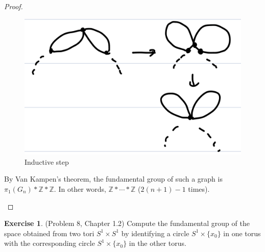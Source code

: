 \documentclass[12pt, psamsfonts]{amsart}
\theoremstyle{definition}
\newtheorem*{exer}{Exercise}
\theoremstyle{remark}
\numberwithin{equation}{section}
\begin{document}
\begin{proof}
\begin{itemize}
\begin{figure}
        \includegraphics[width=.5\linewidth]{induction.jpeg}
          \caption{Inductive step}
        \label{fig:ind}
      \end{figure}
      By Van Kampen's theorem, the fundamental group of such a graph is $\pi_1(G_n) * \mathbb{Z} * \mathbb{Z}$.
      In other words, $\mathbb{Z} * \cdots * \mathbb{Z}$ ($2(n + 1) - 1$ times).
  \end{itemize}
\end{proof}

\begin{exer}{(Problem 8, Chapter 1.2)}
  Compute the fundamental group of the space obtained from two tori $S^1 \times S^1$ by identifying a circle $S^1 \times \{ x_0 \}$ in one torus with the corresponding circle $S^1 \times \{ x_0 \}$ in the other torus.
\end{exer}
\end{document}
